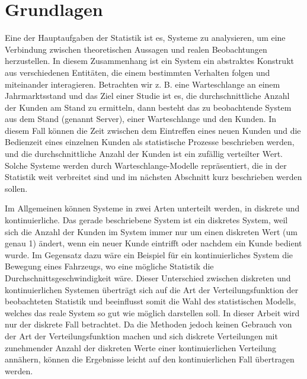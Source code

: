 \chapter{Grundlagen}

\label{chapter:kap2}

Eine der Hauptaufgaben der Statistik ist es, Systeme zu analysieren, um eine Verbindung zwischen theoretischen Aussagen und realen Beobachtungen herzustellen.
In diesem Zusammenhang ist ein System ein abstraktes Konstrukt aus verschiedenen Entitäten, die einem bestimmten Verhalten folgen und miteinander interagieren.
Betrachten wir z. B. eine Warteschlange an einem Jahrmarktsstand und das Ziel einer Studie ist es, die durchschnittliche Anzahl der Kunden am Stand zu ermitteln, dann besteht das zu beobachtende System aus dem Stand (genannt Server), einer Warteschlange und den Kunden.
In diesem Fall können die Zeit zwischen dem Eintreffen eines neuen Kunden und die Bedienzeit eines einzelnen Kunden als statistische Prozesse beschrieben werden, und die durchschnittliche Anzahl der Kunden ist ein zufällig verteilter Wert.
Solche Systeme werden durch Warteschlange-Modelle repräsentiert, die in der Statistik weit verbreitet sind und im nächsten Abschnitt kurz beschrieben werden sollen. 

Im Allgemeinen können Systeme in zwei Arten unterteilt werden, in diskrete und kontinuierliche. 
Das gerade beschriebene System ist ein diskretes System, weil sich die Anzahl der Kunden im System immer nur um einen diskreten Wert (um genau 1) ändert, wenn ein neuer Kunde eintrifft oder nachdem ein Kunde bedient wurde.
Im Gegensatz dazu wäre ein Beispiel für ein kontinuierliches System die Bewegung eines Fahrzeugs, wo eine mögliche Statistik die Durchschnittsgeschwindigkeit wäre. 
Dieser Unterschied zwischen diskreten und kontinuierlichen Systemen überträgt sich auf die Art der Verteilungsfunktion der beobachteten Statistik und beeinflusst somit die Wahl des statistischen Modells, welches das reale System so gut wie möglich darstellen soll. 
In dieser Arbeit wird nur der diskrete Fall betrachtet.
Da die Methoden jedoch keinen Gebrauch von der Art der Verteilungsfunktion machen und sich diskrete Verteilungen mit zunehmender Anzahl der diskreten Werte einer kontinuierlichen Verteilung annähern, können die Ergebnisse leicht auf den kontinuierlichen Fall übertragen werden.

